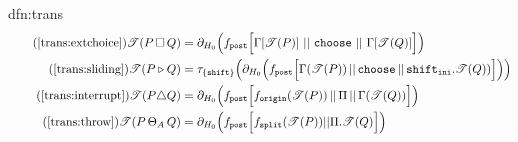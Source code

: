 \documentclass[../hons_project.tex]{subfiles}
\begin{document}
\begin{dfn}{dfn:trans}{}
\begin{align}
		\tag{\ref{trans:extchoice}}
		\trans{P \extchoice Q} & = \partial_{H_{0}}\Bigl(\fdef{post}\Bigl[\Gamma[\trans{P}]\, \merge \,\mathtt{choose}\, \merge \,\Gamma[\trans{Q}]\Bigl]\Bigr)                                                               \\
		\tag{\ref{trans:sliding}}
		\trans{P \sliding Q}   & = \tau_{\{\mathtt{shift}\}}\Bigl(\partial_{H_{0}}\Bigl(f_{\mathtt{post}}\Bigl[ \Gamma(\trans{P}) \merge \mathtt{choose} \merge \mathtt{shift}_{\mathtt{ini}} . \trans{Q}) \Bigr]\Bigr)\Bigr) \\
		\tag{\ref{trans:interrupt}}
		\trans{P \interrupt Q} & = \partial_{H_{0}}\Bigl(\fdef{post}\Bigl[ \fdef{origin}(\trans{P}) \merge \Pi \merge \Gamma(\trans{Q}) \Bigr]\Bigr)                                                                          \\
		\tag{\ref{trans:throw}}
		\trans{P \throw Q}     & = \partial_{H_{0}}\Bigl(\fdef{post} \Bigl[ \fdef{split}(\trans{P}) | | \Pi.\trans{Q} \Bigr]\Bigr)
	\end{align}
\end{dfn}
\end{document}
